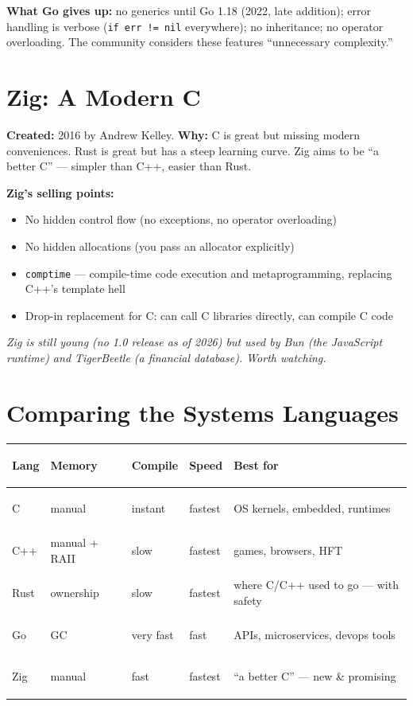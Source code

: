 \documentclass[11pt, letterpaper]{article}
\begin{document}
\textbf{What Go gives up:} no generics until Go 1.18 (2022, late addition); error handling is verbose (\texttt{if err != nil} everywhere); no inheritance; no operator overloading. The community considers these features ``unnecessary complexity.''

\section*{Zig: A Modern C}

\textbf{Created:} 2016 by Andrew Kelley. \textbf{Why:} C is great but missing modern conveniences. Rust is great but has a steep learning curve. Zig aims to be ``a better C'' --- simpler than C++, easier than Rust.

\textbf{Zig's selling points:}
\begin{itemize}[noitemsep]
  \item No hidden control flow (no exceptions, no operator overloading)
  \item No hidden allocations (you pass an allocator explicitly)
  \item \texttt{comptime} --- compile-time code execution and metaprogramming, replacing C++'s template hell
  \item Drop-in replacement for C: can call C libraries directly, can compile C code
\end{itemize}

\textit{Zig is still young (no 1.0 release as of 2026) but used by Bun (the JavaScript runtime) and TigerBeetle (a financial database). Worth watching.}

\section*{Comparing the Systems Languages}

\noindent
{\small\renewcommand{\arraystretch}{1.6}
\begin{tabularx}{\textwidth}{>{\bfseries\raggedright\arraybackslash}p{2cm}
                              >{\centering\arraybackslash}p{1.8cm}
                              >{\centering\arraybackslash}p{1.6cm}
                              >{\centering\arraybackslash}p{1.5cm}
                              >{\raggedright\arraybackslash}X}
\toprule
\rowcolor{tableheaderred}
\textbf{Lang} & \textbf{Memory} & \textbf{Compile} & \textbf{Speed} & \textbf{Best for} \\
\midrule
\rowcolor{rowRe} C    & manual     & instant    & fastest & OS kernels, embedded, runtimes \\
\rowcolor{rowA}  C++  & manual + RAII & slow    & fastest & games, browsers, HFT \\
\rowcolor{rowRe} Rust & ownership  & slow       & fastest & where C/C++ used to go --- with safety \\
\rowcolor{rowA}  Go   & GC         & very fast  & fast    & APIs, microservices, devops tools \\
\rowcolor{rowRe} Zig  & manual     & fast       & fastest & ``a better C'' --- new \& promising \\
\bottomrule
\end{tabularx}}
\end{document}
